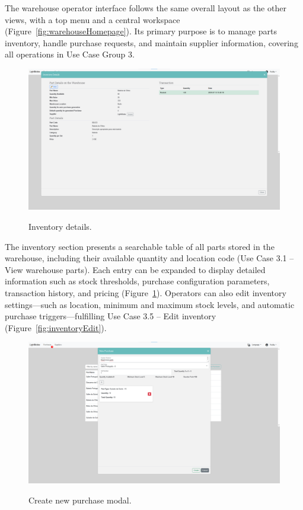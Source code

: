 The warehouse operator interface follows the same overall layout as the other views, with a top menu and a central workspace (Figure~\ref{fig:warehouseHomepage}). Its primary purpose is to manage parts inventory, handle purchase requests, and maintain supplier information, covering all operations in Use Case Group 3.


\begin{figure}[h]
  \caption{Inventory details.}
  \centering
  \includegraphics[width=\textwidth]{figs/Implementation/warehouse/inventoryDetails}
  \label{fig:inventoryDetails}
\end{figure}


The inventory section presents a searchable table of all parts stored in the warehouse, including their available quantity and location code (Use Case 3.1 – View warehouse parts). Each entry can be expanded to display detailed information such as stock thresholds, purchase configuration parameters, transaction history, and pricing (Figure~\ref{fig:inventoryDetails}). Operators can also edit inventory settings—such as location, minimum and maximum stock levels, and automatic purchase triggers—fulfilling Use Case 3.5 – Edit inventory (Figure~\ref{fig:inventoryEdit}).


\begin{figure}[h]
  \caption{Create new purchase modal.}
  \centering
  \includegraphics[width=\textwidth]{figs/Implementation/warehouse/createPurchase}
  \label{fig:createPurchase}
\end{figure}


